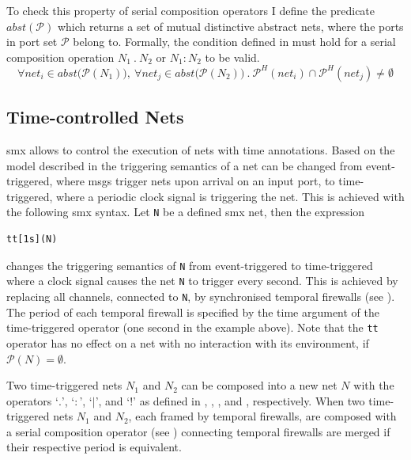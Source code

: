 To check this property of serial composition operators I define the predicate $abst(\mathcal{P})$ which returns a set of mutual distinctive abstract nets, where the ports in port set $\mathcal{P}$ belong to.
Formally, the condition defined in \Equ{\ref{eq_smx_dist}} must hold for a serial composition operation $N_1 \ . \ N_2$ or $N_1 : N_2$ to be valid.
\begin{equation}
    \label{eq_smx_dist}
    \forall net_i \in abst \big (\mathcal{P}(N_1) \big ), \ \forall net_j \in abst \big (\mathcal{P}(N_2) \big ) \ . \ \mathcal{P}^H(net_i) \cap \mathcal{P}^H(net_j) \neq \emptyset
\end{equation}


\subsection{Time-controlled Nets}
\label{sect_smx_network_time}
\Gls*{smx} allows to control the execution of nets with time annotations.
Based on the model described in \Chap{\ref{chap_tcm}} the triggering semantics of a net can be changed from event-triggered, where \glspl*{msg} trigger nets upon arrival on an input port, to time-triggered, where a periodic clock signal is triggering the net.
This is achieved with the following \gls*{smx} syntax.
Let \texttt{N} be a defined \gls*{smx} net, then the expression
\begin{lstlisting}[numbers=none]
tt[1s](N)
\end{lstlisting}
changes the triggering semantics of \texttt{N} from event-triggered to time-triggered where a clock signal causes the net \texttt{N} to trigger every second.
This is achieved by replacing all channels, connected to \texttt{N}, by synchronised temporal firewalls (see \Sect{\ref{sect_smx_box_implicit_tt}}).
The period of each temporal firewall is specified by the time argument of the time-triggered operator (one second in the example above).
Note that the \texttt{tt} operator has no effect on a net with no interaction with its environment, \ie if $\mathcal{P}(N) = \emptyset$.

Two time-triggered nets $N_1$ and $N_2$ can be composed into a new net $N$ with the operators `$.$', `$:$', `$|$', and `$!$' as defined in \Def{\ref{def_smx_sl}}, \Def{\ref{def_smx_so}}, \Def{\ref{def_smx_pd}}, and \Def{\ref{def_smx_pnd}}, respectively.
When two time-triggered nets $N_1$ and $N_2$, each framed by temporal firewalls, are composed with a serial composition operator (see \Sect{\ref{sect_smx_network_serial}}) connecting temporal firewalls are merged if their respective period is equivalent.


